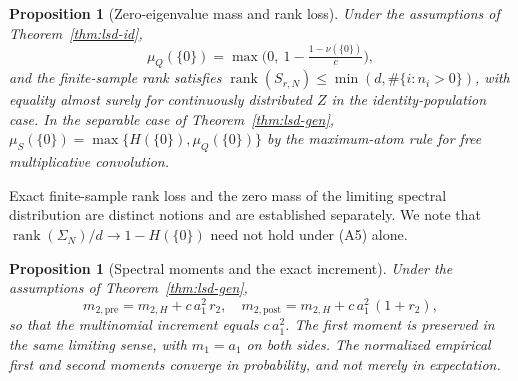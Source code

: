 \documentclass[lettersize,journal]{IEEEtran}
\newtheorem{prop}[theo]{Proposition}
\theoremstyle{remark}
\begin{document}
\begin{prop}[Zero-eigenvalue mass and rank loss\cite{belinschi-atoms}]
\label{prop:atom}
Under the assumptions of Theorem~\ref{thm:lsd-id},
\begin{equation}
  \mu_Q(\{0\})=\max\Big(0,\ 1-\tfrac{1-\nu(\{0\})}{c}\Big),
  \label{eq:atom}
\end{equation}
and the finite-sample rank satisfies
$\operatorname{rank}(S_{r,N})\le\min(d,\#\{i:n_i>0\})$, with equality almost
surely for continuously distributed $Z$ in the identity-population case. In
the separable case of Theorem~\ref{thm:lsd-gen},
$\mu_S(\{0\})=\max\{H(\{0\}),\mu_Q(\{0\})\}$ by the maximum-atom rule for free
multiplicative convolution.
\end{prop}

Exact finite-sample rank loss and the zero mass of the limiting spectral
distribution are distinct notions and are established separately. We note that
$\operatorname{rank}(\Sigma_N)/d\to1-H(\{0\})$ need not hold under (A5) alone.

\begin{prop}[Spectral moments and the exact increment]
\label{prop:moments}
Under the assumptions of Theorem~\ref{thm:lsd-gen},
\begin{equation}
  m_{2,\mathrm{pre}}=m_{2,H}+c\,a_1^2\,r_2,\quad
  m_{2,\mathrm{post}}=m_{2,H}+c\,a_1^2\,(1+r_2),
  \label{eq:moments}
\end{equation}
so that the multinomial increment equals $c\,a_1^2$. The first moment is
preserved in the same limiting sense, with $m_1=a_1$ on both sides. The
normalized empirical first and second moments converge in probability, and not
merely in expectation.
\end{prop}
\end{document}
